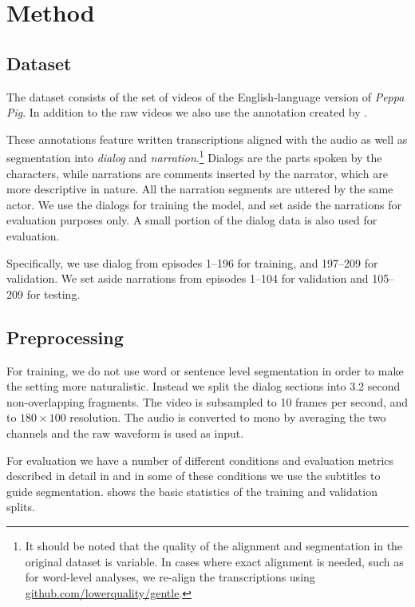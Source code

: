 \section{Method}
\label{sec:method}

\subsection{Dataset}
The dataset consists of the set of videos of the
English-language version of {\it Peppa Pig}. In addition to the raw
videos we  also use the annotation created by
\citep{papasarantopoulos2021narration}.

These annotations feature written transcriptions aligned with the
audio as well as segmentation into {\it dialog} and {\it
  narration}.\footnote{It should be noted that the quality of the
  alignment and segmentation in the original dataset is variable. In
  cases where exact alignment is needed, such as for word-level
  analyses, we re-align the transcriptions using
  \url{github.com/lowerquality/gentle}.}  Dialogs are the parts spoken
by the characters, while narrations are comments inserted by the
narrator, which are more descriptive in nature. All the narration
segments are uttered by the same actor. We use the dialogs for
training the model, and set aside the narrations for evaluation
purposes only. A small portion of the dialog data is also used for
evaluation.

Specifically, we use dialog from episodes 1--196 for training, and
197--209 for validation. We set aside narrations from episodes 1--104
for validation and 105--209 for testing.


\subsection{Preprocessing}
For training, we do not use word or sentence level segmentation in
order to make the setting more naturalistic. Instead we split the
dialog sections into 3.2 second non-overlapping fragments. The video
is subsampled to 10 frames per second, and to $180\times 100$ resolution. The
audio is converted to mono by averaging the two channels  and the raw
waveform is used as input.


For evaluation we have a number of different conditions and evaluation
metrics described in detail in  and in some of these
conditions we use the subtitles to guide
segmentation.  shows the basic statistics of the
training and validation splits.

